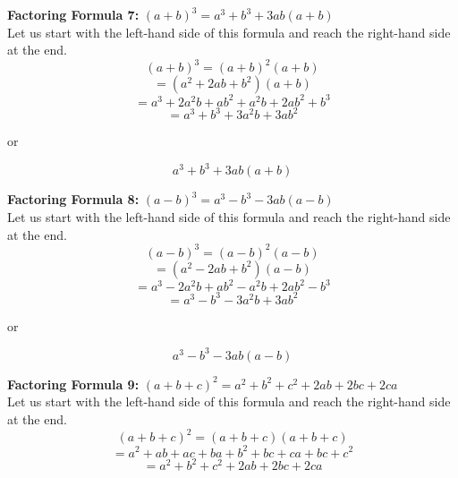 \begin{framed}
  \noindent \textbf{Factoring Formula 7:} $(a+b)^3=a^3+b^3+3ab(a+b)$\\
  \noindent Let us start with the left-hand side of this formula and reach the 
  right-hand side at the end.\\
  \begin{equation*}
    (a+b)^3 = (a+b)^2(a+b)
  \end{equation*}
  \begin{equation*}
    =(a^2+2ab+b^2)(a+b)
  \end{equation*}
  \begin{equation*}
    =a^3+2a^2b+ab^2+a^2b+2ab^2+b^3
  \end{equation*}
  \begin{equation*}
    =a^3+b^3+3a^2b+3ab^2
  \end{equation*}
  \centerline{or}
  \begin{equation*}
    a^3+b^3+3ab(a+b)
  \end{equation*}
\end{framed}


\begin{framed}
  \noindent \textbf{Factoring Formula 8:} $(a-b)^3=a^3-b^3-3ab(a-b)$\\
  \noindent Let us start with the left-hand side of this formula and reach the 
  right-hand side at the end.\\
  \begin{equation*}
    (a-b)^3 = (a-b)^2(a-b)
  \end{equation*}
  \begin{equation*}
    =(a^2-2ab+b^2)(a-b)
  \end{equation*}
  \begin{equation*}
    =a^3-2a^2b+ab^2-a^2b+2ab^2-b^3
  \end{equation*}
  \begin{equation*}
    =a^3-b^3-3a^2b+3ab^2
  \end{equation*}
  \centerline{or}
  \begin{equation*}
    a^3-b^3-3ab(a-b)
  \end{equation*}
\end{framed}

\begin{framed}
  \noindent \textbf{Factoring Formula 9:} $(a+b+c)^2=a^2+b^2+c^2+2ab+2bc+2ca$\\
  \noindent Let us start with the left-hand side of this formula and reach the 
  right-hand side at the end.\\
  \begin{equation*}
    (a+b+c)^2 = (a+b+c)(a+b+c)
  \end{equation*}
  \begin{equation*}
    =a^2+ab+ac+ba+b^2+bc+ca+bc+c^2
  \end{equation*}
  \begin{equation*}
    =a^2+b^2+c^2+2ab+2bc+2ca
  \end{equation*}
\end{framed}


